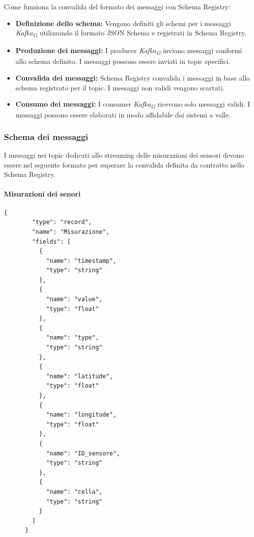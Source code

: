 Come funziona la convalida del formato dei messaggi con Schema Registry:
\begin{itemize}
    \item \textbf{Definizione dello schema:} Vengono definiti gli schemi per i messaggi \textit{Kafka}\textsubscript{\textit{G}} utilizzando il formato JSON Schema e registrati in Schema Registry.
    \item \textbf{Produzione dei messaggi:} I producer \textit{Kafka}\textsubscript{\textit{G}} inviano messaggi conformi allo schema definito. I messaggi possono essere inviati in topic specifici.
    \item \textbf{Convalida dei messaggi:} Schema Registry convalida i messaggi in base allo schema registrato per il topic. I messaggi non validi vengono scartati.
    \item \textbf{Consumo dei messaggi:} I consumer \textit{Kafka}\textsubscript{\textit{G}} ricevono solo messaggi validi. I messaggi possono essere elaborati in modo affidabile dai sistemi a valle.
\end{itemize}

\subsubsection{Schema dei messaggi}\label{sec:schema_registry_sez_schema}
I messaggi nei topic dedicati allo streaming delle misurazioni dei sensori devono essere nel seguente formato per superare la convalida definita da contratto nello Schema Registry.
\paragraph{Misurazioni dei senori}
\begin{lstlisting}[style=code]
    {
        "type": "record",
        "name": "Misurazione",
        "fields": [
          {
            "name": "timestamp",
            "type": "string"
          },
          {
            "name": "value",
            "type": "float"
          },
          {
            "name": "type",
            "type": "string"
          },
          {
            "name": "latitude",
            "type": "float"
          },
          {
            "name": "longitude",
            "type": "float"
          },
          {
            "name": "ID_sensore",
            "type": "string"
          },
          {
            "name": "cella",
            "type": "string"
          }
        ]
      }
\end{lstlisting}


